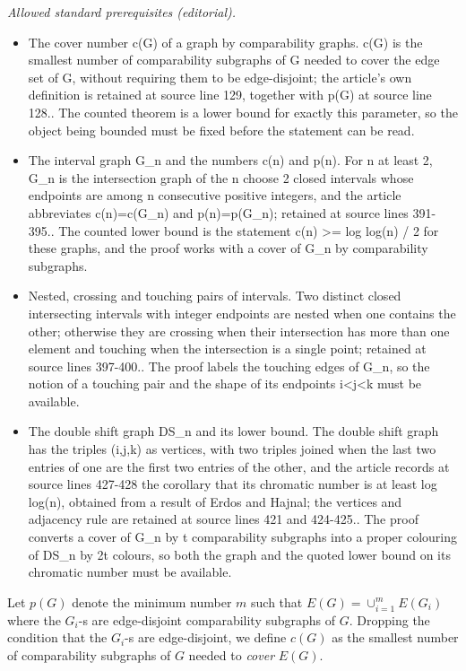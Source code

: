 \documentclass[12pt]{article}
\begin{document}
\noindent\textit{Allowed standard prerequisites (editorial).}\begin{itemize}
\item The cover number c(G) of a graph by comparability graphs. c(G) is the smallest number of comparability subgraphs of G needed to cover the edge set of G, without requiring them to be edge-disjoint; the article's own definition is retained at source line 129, together with p(G) at source line 128.. The counted theorem is a lower bound for exactly this parameter, so the object being bounded must be fixed before the statement can be read.
\item The interval graph G\_n and the numbers c(n) and p(n). For n at least 2, G\_n is the intersection graph of the n choose 2 closed intervals whose endpoints are among n consecutive positive integers, and the article abbreviates c(n)=c(G\_n) and p(n)=p(G\_n); retained at source lines 391-395.. The counted lower bound is the statement c(n) >= log log(n) / 2 for these graphs, and the proof works with a cover of G\_n by comparability subgraphs.
\item Nested, crossing and touching pairs of intervals. Two distinct closed intersecting intervals with integer endpoints are nested when one contains the other; otherwise they are crossing when their intersection has more than one element and touching when the intersection is a single point; retained at source lines 397-400.. The proof labels the touching edges of G\_n, so the notion of a touching pair and the shape of its endpoints i<j<k must be available.
\item The double shift graph DS\_n and its lower bound. The double shift graph has the triples (i,j,k) as vertices, with two triples joined when the last two entries of one are the first two entries of the other, and the article records at source lines 427-428 the corollary that its chromatic number is at least log log(n), obtained from a result of Erdos and Hajnal; the vertices and adjacency rule are retained at source lines 421 and 424-425.. The proof converts a cover of G\_n by t comparability subgraphs into a proper colouring of DS\_n by 2t colours, so both the graph and the quoted lower bound on its chromatic number must be available.
\end{itemize}\medskip
Let $p(G)$ denote the minimum number $m$ such that $E(G)=\cup_{i=1}^m E(G_i)$ where the $G_i$-s are edge-disjoint comparability subgraphs of $G$.
Dropping  the condition that the $G_i$-s are edge-disjoint, we define $c(G)$ as the smallest number of comparability subgraphs of $G$ needed to {\em cover} $E(G)$.
\end{document}
